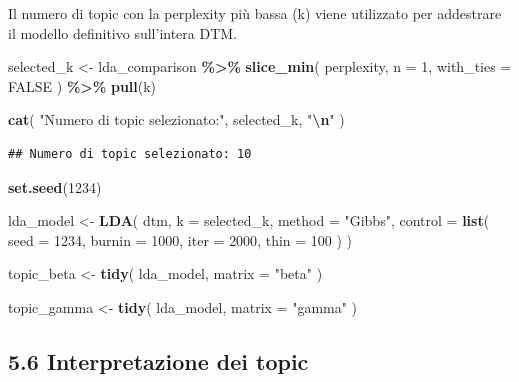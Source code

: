 \documentclass[
]{article}
\newenvironment{Shaded}{\begin{snugshade}}{\end{snugshade}}
\newcommand{\AttributeTok}[1]{\textcolor[rgb]{0.13,0.29,0.53}{#1}}
\newcommand{\ConstantTok}[1]{\textcolor[rgb]{0.56,0.35,0.01}{#1}}
\newcommand{\DecValTok}[1]{\textcolor[rgb]{0.00,0.00,0.81}{#1}}
\newcommand{\FunctionTok}[1]{\textcolor[rgb]{0.13,0.29,0.53}{\textbf{#1}}}
\newcommand{\NormalTok}[1]{#1}
\newcommand{\OtherTok}[1]{\textcolor[rgb]{0.56,0.35,0.01}{#1}}
\newcommand{\SpecialCharTok}[1]{\textcolor[rgb]{0.81,0.36,0.00}{\textbf{#1}}}
\newcommand{\StringTok}[1]{\textcolor[rgb]{0.31,0.60,0.02}{#1}}
\begin{document}
Il numero di topic con la perplexity più bassa (k) viene utilizzato per
addestrare il modello definitivo sull'intera DTM.

\begin{Shaded}
\begin{Highlighting}[]
\NormalTok{selected\_k }\OtherTok{\textless{}{-}}\NormalTok{ lda\_comparison }\SpecialCharTok{\%\textgreater{}\%}
  \FunctionTok{slice\_min}\NormalTok{(}
\NormalTok{    perplexity,}
    \AttributeTok{n =} \DecValTok{1}\NormalTok{,}
    \AttributeTok{with\_ties =} \ConstantTok{FALSE}
\NormalTok{  ) }\SpecialCharTok{\%\textgreater{}\%}
  \FunctionTok{pull}\NormalTok{(k)}

\FunctionTok{cat}\NormalTok{(}
  \StringTok{"Numero di topic selezionato:"}\NormalTok{,}
\NormalTok{  selected\_k,}
  \StringTok{"}\SpecialCharTok{\textbackslash{}n}\StringTok{"}
\NormalTok{)}
\end{Highlighting}
\end{Shaded}

\begin{verbatim}
## Numero di topic selezionato: 10
\end{verbatim}

\begin{Shaded}
\begin{Highlighting}[]
\FunctionTok{set.seed}\NormalTok{(}\DecValTok{1234}\NormalTok{)}

\NormalTok{lda\_model }\OtherTok{\textless{}{-}} \FunctionTok{LDA}\NormalTok{(}
\NormalTok{  dtm,}
  \AttributeTok{k =}\NormalTok{ selected\_k,}
  \AttributeTok{method =} \StringTok{"Gibbs"}\NormalTok{,}
  \AttributeTok{control =} \FunctionTok{list}\NormalTok{(}
    \AttributeTok{seed =} \DecValTok{1234}\NormalTok{,}
    \AttributeTok{burnin =} \DecValTok{1000}\NormalTok{,}
    \AttributeTok{iter =} \DecValTok{2000}\NormalTok{,}
    \AttributeTok{thin =} \DecValTok{100}
\NormalTok{  )}
\NormalTok{)}

\NormalTok{topic\_beta }\OtherTok{\textless{}{-}} \FunctionTok{tidy}\NormalTok{(}
\NormalTok{  lda\_model,}
  \AttributeTok{matrix =} \StringTok{"beta"}
\NormalTok{)}

\NormalTok{topic\_gamma }\OtherTok{\textless{}{-}} \FunctionTok{tidy}\NormalTok{(}
\NormalTok{  lda\_model,}
  \AttributeTok{matrix =} \StringTok{"gamma"}
\NormalTok{)}
\end{Highlighting}
\end{Shaded}

\subsection{5.6 Interpretazione dei
topic}\label{interpretazione-dei-topic}
\end{document}
